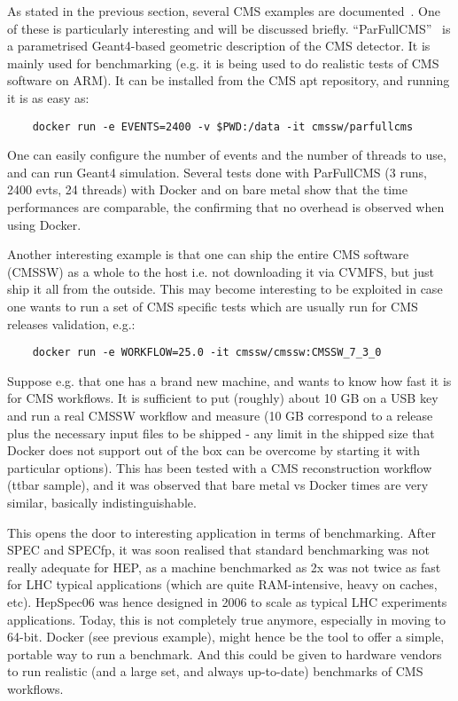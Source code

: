 \documentclass{PoS}
\begin{document}
As stated in the previous section, several CMS examples are documented~\cite{DockerGiulio}. One of these is particularly interesting and will be discussed briefly. ``ParFullCMS''~\cite{parfullcms} is a parametrised Geant4-based geometric description of the CMS detector. It is mainly used for benchmarking (e.g. it is being used to do realistic tests of CMS software on ARM). It can be installed from the CMS apt repository, and running it is as easy as:
%
\begin{verbatim}
    docker run -e EVENTS=2400 -v $PWD:/data -it cmssw/parfullcms
\end{verbatim}
%
One can easily configure the number of events and the number of threads to use, and can run Geant4 simulation. Several tests done with ParFullCMS (3 runs, 2400 evts, 24 threads) with Docker and on bare metal show that the time performances are comparable, the confirming that no overhead is observed when using Docker.

Another interesting example is that one can ship the entire CMS software (CMSSW) as a whole to the host i.e. not downloading it via CVMFS, but just ship it all from the outside. This may become interesting to be exploited in case one wants to run a set of CMS specific tests which are usually run for CMS releases validation, e.g.:
%
\begin{verbatim}
    docker run -e WORKFLOW=25.0 -it cmssw/cmssw:CMSSW_7_3_0
\end{verbatim}
%
Suppose e.g. that one has a brand new machine, and wants to know how fast it is for CMS workflows. It is sufficient to put (roughly) about 10 GB on a USB key and run a real CMSSW workflow and measure (10 GB correspond to a release plus the necessary input files to be shipped - any limit in the shipped size that Docker does not support out of the box can be overcome by starting it with particular options). This has been tested with a CMS reconstruction workflow (ttbar sample), and it was observed that bare metal vs Docker
times are very similar, basically indistinguishable.

This opens the door to interesting application in terms of benchmarking. After SPEC and SPECfp, it was soon realised that standard benchmarking was not really adequate for HEP, as a machine benchmarked as 2x was not twice as fast for LHC typical applications (which are quite RAM-intensive, heavy on caches, etc). HepSpec06 was hence designed in 2006 to scale as typical LHC experiments applications. Today, this is not completely true anymore, especially in moving to 64-bit. Docker (see previous example), might hence be the tool to offer a simple, portable way to run a benchmark. And this could be given to hardware vendors to run realistic (and a large set, and always up-to-date) benchmarks of CMS workflows.
\end{document}
